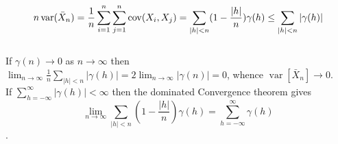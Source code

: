 \documentclass[12pt]{article}
\def\var{\operatorname{var}}
\def\cov{\operatorname{cov}}
\begin{document}
$$n\var(\bar X_n)=\frac{1}{n}\sum_{i=1}^{n}\sum_{j=1}^{n}\cov(X_i,X_j)\\=
\sum_{|h|<n}(1-\frac{|h|}{n})\gamma(h)\leq \sum_{|h|<n}|\gamma(h)|$$
\\If $\gamma(n) \to 0$ as  $n \to \infty$ then $\lim_{n \to \infty }\frac{1}{n}\sum_{|h|<n}|\gamma(h)|=2\lim_{n \to \infty }|\gamma(n)|=0$, whence 
$\var[\bar X_n] \to 0$.
\\If $\sum_{h=-\infty}^{\infty}|\gamma(h)|<\infty$ then the dominated Convergence theorem gives 
$$\lim_{n \to \infty }\sum_{|h|<n}(1-\frac{|h|}{n})\gamma(h)=\sum_{h=-\infty}^{\infty}\gamma(h)$$.
\end{document}
